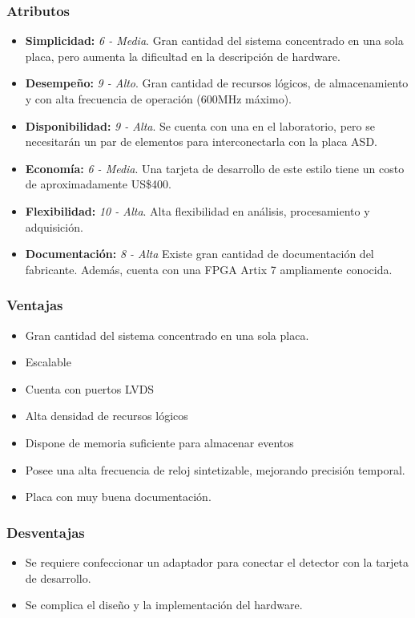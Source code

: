 	\newpage
	\subsubsection*{Atributos}
	\begin{itemize}
		\item \textbf{Simplicidad:}  \textit{6 - Media}. Gran cantidad del sistema concentrado en una sola placa, pero aumenta la dificultad en la descripción de hardware.
		\item \textbf{Desempeño:}  \textit{9 - Alto}. Gran cantidad de recursos lógicos, de almacenamiento y con alta  frecuencia de operación (600MHz máximo).
		\item \textbf{Disponibilidad: } \textit{9 - Alta}. Se cuenta con una en el laboratorio, pero se necesitarán un par de elementos para interconectarla con la placa ASD.
		\item \textbf{Economía: }\textit{6 - Media}. Una tarjeta de desarrollo de este estilo tiene un costo de aproximadamente US\$400.
		\item \textbf{Flexibilidad:} \textit{10 - Alta}. Alta flexibilidad en análisis, procesamiento y adquisición.
		\item \textbf{Documentación:} \textit{8 - Alta} Existe gran cantidad de documentación del fabricante. Además, cuenta con una FPGA Artix 7 ampliamente conocida.
	\end{itemize}
	
	
	\subsubsection*{Ventajas}
	\begin{itemize}
		\item Gran cantidad del sistema concentrado en una sola placa.
		\item Escalable
		\item Cuenta con puertos LVDS
		\item Alta densidad de recursos lógicos
		\item Dispone de memoria suficiente para almacenar eventos
		\item Posee una alta frecuencia de reloj sintetizable, mejorando precisión temporal.
		\item Placa con muy buena documentación.
	\end{itemize}
	
	
	\subsubsection*{Desventajas}
	\begin{itemize}
		\item Se requiere confeccionar un adaptador para conectar el detector con la tarjeta de desarrollo.
		\item Se complica el diseño y la implementación del hardware.
	\end{itemize}
	

